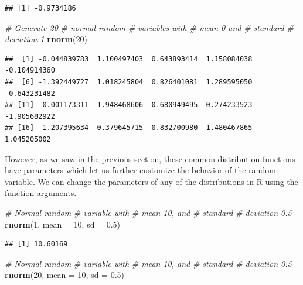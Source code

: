 \documentclass[
]{book}
\newenvironment{Shaded}{\begin{snugshade}}{\end{snugshade}}
\newcommand{\CommentTok}[1]{\textcolor[rgb]{0.56,0.35,0.01}{\textit{#1}}}
\newcommand{\DataTypeTok}[1]{\textcolor[rgb]{0.13,0.29,0.53}{#1}}
\newcommand{\DecValTok}[1]{\textcolor[rgb]{0.00,0.00,0.81}{#1}}
\newcommand{\FloatTok}[1]{\textcolor[rgb]{0.00,0.00,0.81}{#1}}
\newcommand{\KeywordTok}[1]{\textcolor[rgb]{0.13,0.29,0.53}{\textbf{#1}}}
\newcommand{\NormalTok}[1]{#1}
\begin{document}
\begin{verbatim}
## [1] -0.9734186
\end{verbatim}

\begin{Shaded}
\begin{Highlighting}[]
\CommentTok{# Generate 20}
\CommentTok{# normal random}
\CommentTok{# variables with}
\CommentTok{# mean 0 and}
\CommentTok{# standard}
\CommentTok{# deviation 1}
\KeywordTok{rnorm}\NormalTok{(}\DecValTok{20}\NormalTok{)}
\end{Highlighting}
\end{Shaded}

\begin{verbatim}
##  [1] -0.044839783  1.100497403  0.643893414  1.158084038 -0.104914360
##  [6] -1.392449727  1.018245804  0.826401081  1.289595050 -0.643231482
## [11] -0.001173311 -1.948468606  0.680949495  0.274233523 -1.905682922
## [16] -1.207395634  0.379645715 -0.832700980 -1.480467865  1.045205002
\end{verbatim}

However, as we saw in the previous section, these common distribution functions have parameters which let us further customize the behavior of the random variable. We can change the parameters of any of the distributions in R using the function arguments.

\begin{Shaded}
\begin{Highlighting}[]
\CommentTok{# Normal random}
\CommentTok{# variable with}
\CommentTok{# mean 10, and}
\CommentTok{# standard}
\CommentTok{# deviation 0.5}
\KeywordTok{rnorm}\NormalTok{(}\DecValTok{1}\NormalTok{, }\DataTypeTok{mean =} \DecValTok{10}\NormalTok{, }\DataTypeTok{sd =} \FloatTok{0.5}\NormalTok{)}
\end{Highlighting}
\end{Shaded}

\begin{verbatim}
## [1] 10.60169
\end{verbatim}

\begin{Shaded}
\begin{Highlighting}[]
\CommentTok{# Normal random}
\CommentTok{# variable with}
\CommentTok{# mean 10, and}
\CommentTok{# standard}
\CommentTok{# deviation 0.5}
\KeywordTok{rnorm}\NormalTok{(}\DecValTok{20}\NormalTok{, }\DataTypeTok{mean =} \DecValTok{10}\NormalTok{,}
    \DataTypeTok{sd =} \FloatTok{0.5}\NormalTok{)}
\end{Highlighting}
\end{Shaded}
\end{document}
